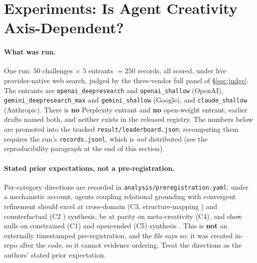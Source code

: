 \section{Experiments: Is Agent Creativity Axis-Dependent?}
\label{sec:experiments}

\paragraph{What was run.} One run: $50$ challenges $\times$ $5$ entrants $=250$ records, all scored,
under live provider-native web search, judged by the three-vendor full panel of \S\ref{sec:judge}.
The entrants are \texttt{openai\_deepresearch} and \texttt{openai\_shallow} (OpenAI),
\texttt{gemini\_deepresearch\_max} and \texttt{gemini\_shallow} (Google), and
\texttt{claude\_shallow} (Anthropic). There is \textbf{no} Perplexity entrant and \textbf{no}
open-weight entrant; earlier drafts named both, and neither exists in the released registry. The
numbers below are promoted into the tracked \texttt{result/leaderboard.json}; recomputing them
requires the run's \texttt{records.jsonl}, which is \emph{not} distributed (see the reproducibility
paragraph at the end of this section).

\paragraph{Stated prior expectations, not a pre-registration.} Per-category directions are recorded
in \texttt{analysis/preregistration.yaml}: under a mechanistic account, agents coupling relational
grounding with convergent refinement should excel at cross-domain (C3, structure-mapping
\citep{gentner1983structure}) and counterfactual (C2 \citep{byrne2005rational}) synthesis, be at
parity on meta-creativity (C4), and show nulls on constrained (C1) and open-ended (C5) synthesis
\citep{boden2004creative,campbell1960blind}. This is \textbf{not} an externally timestamped
pre-registration, and the file says so: it was created in-repo after the code, so it cannot evidence
ordering. Treat the directions as the authors' stated prior expectation.

